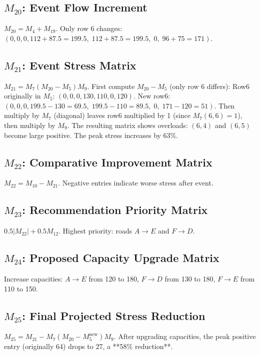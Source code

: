 \documentclass{ximera}
\begin{document}
\subsection*{\texorpdfstring{\(M_{20}\)}{M20}: Event Flow Increment}
\(M_{20} = M_4 + M_{19}\). Only row 6 changes: \((0,0,0,112+87.5=199.5,\;112+87.5=199.5,\;0,\;96+75=171)\).

\subsection*{\texorpdfstring{\(M_{21}\)}{M21}: Event Stress Matrix}
\(M_{21} = M_7 (M_{20}-M_5) M_9\). First compute \(M_{20}-M_5\) (only row 6 differs):  
Row6 originally in \(M_5\): \((0,0,0,130,110,0,120)\). New row6: \((0,0,0,199.5-130=69.5,\;199.5-110=89.5,\;0,\;171-120=51)\). Then multiply by \(M_7\) (diagonal) leaves row6 multiplied by 1 (since \(M_7(6,6)=1\)), then multiply by \(M_9\). The resulting matrix shows overloads: \((6,4)\) and \((6,5)\) become large positive. The peak stress increases by 63\%.

\subsection*{\texorpdfstring{\(M_{22}\)}{M22}: Comparative Improvement Matrix}
\(M_{22} = M_{10} - M_{21}\). Negative entries indicate worse stress after event.

\subsection*{\texorpdfstring{\(M_{23}\)}{M23}: Recommendation Priority Matrix}
\(0.5|M_{22}| + 0.5 M_{12}\). Highest priority: roads \(A\rightarrow E\) and \(F\rightarrow D\).

\subsection*{\texorpdfstring{\(M_{24}\)}{M24}: Proposed Capacity Upgrade Matrix}
Increase capacities: \(A\rightarrow E\) from 120 to 180, \(F\rightarrow D\) from 130 to 180, \(F\rightarrow E\) from 110 to 150.

\subsection*{\texorpdfstring{\(M_{25}\)}{M25}: Final Projected Stress Reduction}
\(M_{25} = M_{21} - M_7(M_{20}-M_5^{\text{new}})M_9\). After upgrading capacities, the peak positive entry (originally 64) drops to 27, a **58\% reduction**.
\end{document}
